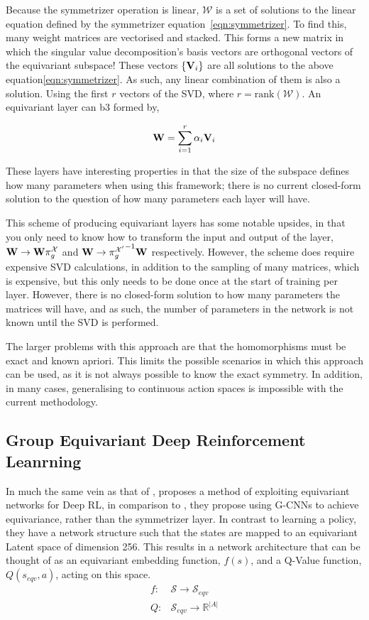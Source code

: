 Because the symmetrizer operation is linear, $\mathcal{W}$ is a set of solutions to the linear equation defined by the symmetrizer equation~\ref{eqn:symmetrizer}. To find this, many weight matrices are vectorised and stacked. This forms a new matrix in which the singular value decomposition's basis vectors are orthogonal vectors of the equivariant subspace! These vectors $\{\mathbf{V}_i\}$ are all solutions to the above equation\ref{eqn:symmetrizer}. As such, any linear combination of them is also a solution. Using the first $r$ vectors of the SVD, where $r= \text{rank}(\mathcal{W})$. An equivariant layer can b3 formed by,

\begin{equation}
	\mathbf{W} = \sum_{i=1}^{r}{\alpha_i\mathbf{V}_i}
\end{equation}

These layers have interesting properties in that the size of the subspace defines how many parameters when using this framework; there is no current closed-form solution to the question of how many parameters each layer will have.

This scheme of producing equivariant layers has some notable upsides, in that you only need to know how to transform the input and output of the layer, $\mathbf{W} \rightarrow \mathbf{W}\pi_g^\mathcal{X}$ and $\mathbf{W} \rightarrow {\pi_g^{\mathcal{X}'}}^{-1} \mathbf{W}$ respectively. However, the scheme does require expensive SVD calculations, in addition to the sampling of many matrices, which is expensive, but this only needs to be done once at the start of training per layer. However, there is no closed-form solution to how many parameters the matrices will have, and as such, the number of parameters in the network is not known until the SVD is performed.

The larger problems with this approach are that the homomorphisms must be exact and known apriori. This limits the possible scenarios in which this approach can be used, as it is not always possible to know the exact symmetry. In addition, in many cases, generalising to continuous action spaces is impossible with the current methodology.


\subsection{Group Equivariant Deep Reinforcement Leanrning}
In much the same vein as that of \cite{vanderpol2020mdp}, \cite{mondal2020group} proposes a method of exploiting equivariant networks for Deep RL, in comparison to \cite{vanderpol2020mdp}, they propose using G-CNNs \cite{cohen2016group} to achieve equivariance, rather than the symmetrizer layer. In contrast to learning a policy, they have a network structure such that the states are mapped to an equivariant Latent space of dimension 256. This results in a network architecture that can be thought of as an equivariant embedding function, $f(s)$, and a Q-Value function, $Q(s_{eqv}, a)$, acting on this space.
\begin{align}
	f: & \mathcal{S} \rightarrow \mathcal{S}_{eqv}      \\
	Q: & \mathcal{S}_{eqv} \rightarrow \mathbb{R}^{|A|}
\end{align}

